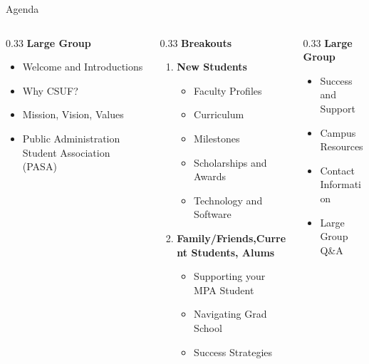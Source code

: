 \documentclass[10pt,aspectratio=169]{beamer}
\begin{document}
\begin{frame}{Agenda}
\footnotesize
\begin{columns}[T,totalwidth=\textwidth]
  \begin{column}{0.33\textwidth}
    \textbf{Large Group}
    \begin{itemize}\setlength{\itemsep}{0pt}
      \item Welcome and Introductions
      \item Why CSUF?
      \item Mission, Vision, Values
      \item Public Administration Student Association (PASA)
    \end{itemize}
  \end{column}

  \begin{column}{0.33\textwidth}
    \textbf{Breakouts}
    \begin{enumerate}\setlength{\itemsep}{0pt}
      \item \textbf{New Students}
        \begin{itemize}\setlength{\itemsep}{0pt}
          \item Faculty Profiles
          \item Curriculum
          \item Milestones
          \item Scholarships and Awards
          \item Technology and Software
        \end{itemize}
      \item \textbf{Family/Friends,Current Students, Alums}
        \begin{itemize}\setlength{\itemsep}{0pt}
          \item Supporting your MPA Student
          \item Navigating Grad School
          \item Success Strategies
        \end{itemize}
    \end{enumerate}
  \end{column}

  \begin{column}{0.33\textwidth}
    \textbf{Large Group}
    \begin{itemize}\setlength{\itemsep}{0pt}
      \item Success and Support
      \item Campus Resources
      \item Contact Information
      \item Large Group Q\&A
    \end{itemize}
  \end{column}
\end{columns}
\end{frame}
\end{document}
